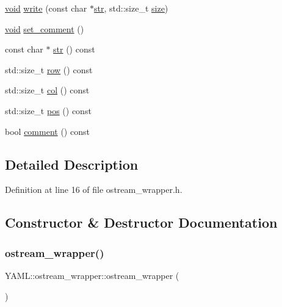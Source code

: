 \begin{DoxyCompactItemize}
\item 
\mbox{\hyperlink{glad_8h_a950fc91edb4504f62f1c577bf4727c29}{void}} \mbox{\hyperlink{class_y_a_m_l_1_1ostream__wrapper_aeea427708949f62b538770d72d1a2a57}{write}} (const char $\ast$\mbox{\hyperlink{class_y_a_m_l_1_1ostream__wrapper_a582c854b4d9abc7344b17f2fa91575c2}{str}}, std\+::size\+\_\+t \mbox{\hyperlink{glad_8h_a79ef9eb3e59c4bb34c4b9fbeb8d28ff7}{size}})
\item 
\mbox{\hyperlink{glad_8h_a950fc91edb4504f62f1c577bf4727c29}{void}} \mbox{\hyperlink{class_y_a_m_l_1_1ostream__wrapper_a915ba192b32d05342619531e626b7580}{set\+\_\+comment}} ()
\item 
const char $\ast$ \mbox{\hyperlink{class_y_a_m_l_1_1ostream__wrapper_a582c854b4d9abc7344b17f2fa91575c2}{str}} () const
\item 
std\+::size\+\_\+t \mbox{\hyperlink{class_y_a_m_l_1_1ostream__wrapper_a80e715ec84df28b7e6b03c005bfe4b5e}{row}} () const
\item 
std\+::size\+\_\+t \mbox{\hyperlink{class_y_a_m_l_1_1ostream__wrapper_a41f5e634e6595d585fdf6607695ff089}{col}} () const
\item 
std\+::size\+\_\+t \mbox{\hyperlink{class_y_a_m_l_1_1ostream__wrapper_a4a42954da9d63544e57e37400ad40280}{pos}} () const
\item 
bool \mbox{\hyperlink{class_y_a_m_l_1_1ostream__wrapper_a4bd22f207c3be8398867ca190bf2bcb3}{comment}} () const
\end{DoxyCompactItemize}


\subsection{Detailed Description}


Definition at line 16 of file ostream\+\_\+wrapper.\+h.



\subsection{Constructor \& Destructor Documentation}
\mbox{\label{class_y_a_m_l_1_1ostream__wrapper_abfe741e8f4d60c66bf30589df9738e9f}} 
\subsubsection{\texorpdfstring{ostream\_wrapper()}{ostream\_wrapper()}\hspace{0.1cm}{\footnotesize\ttfamily [1/4]}}
{\footnotesize\ttfamily Y\+A\+M\+L\+::ostream\+\_\+wrapper\+::ostream\+\_\+wrapper (\begin{DoxyParamCaption}{ }\end{DoxyParamCaption})}



